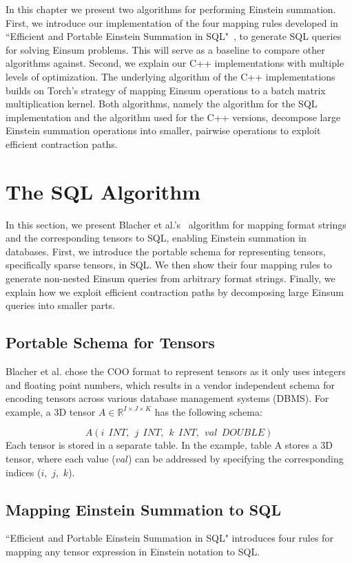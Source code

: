 In this chapter we present two algorithms for performing Einstein summation. First,
we introduce our implementation of the four mapping rules developed in ``Efficient and Portable
Einstein Summation in SQL"~\cite{sql_einsum}, to generate SQL queries for solving Einsum problems.
This will serve as a baseline to compare other algorithms against. Second, we explain our C++
implementations with multiple levels of optimization. The underlying algorithm of the C++
implementations builds on Torch's strategy of mapping Einsum operations to a batch matrix
multiplication kernel. Both algorithms, namely the algorithm for the SQL implementation and
the algorithm used for the C++ versions, decompose large Einstein summation operations
into smaller, pairwise operations to exploit efficient contraction paths.

\section{The SQL Algorithm}
In this section, we present Blacher et al.'s~\cite{sql_einsum} algorithm for mapping format
strings and the corresponding tensors to SQL, enabling Einstein summation in databases.
First, we introduce the portable schema for representing tensors, specifically sparse tensors,
in SQL. We then show their four mapping rules to generate non-nested Einsum queries from
arbitrary format strings. Finally, we explain how we exploit efficient contraction paths
by decomposing large Einsum queries into smaller parts.

\subsection{Portable Schema for Tensors}
Blacher et al. chose the COO format to represent tensors as it only uses integers and
floating point numbers, which results in a vendor independent schema for encoding tensors
across various database management systems (DBMS). For example, a 3D tensor $A \in
    \mathbb{R}^{I \times J \times K}$ has the following schema:

\[
    A(i\ \ INT,\ \ j\ \ INT,\ \ k\ \ INT,\ \ val\ \ DOUBLE)
\]
%
Each tensor is stored in a separate table. In the example, table A stores a 3D tensor,
where each value ($val$) can be addressed by specifying the corresponding indices
($i$,~$j$,~$k$).

\subsection{Mapping Einstein Summation to SQL}
``Efficient and Portable Einstein Summation in SQL" introduces four rules for mapping
any tensor expression in Einstein notation to SQL.

